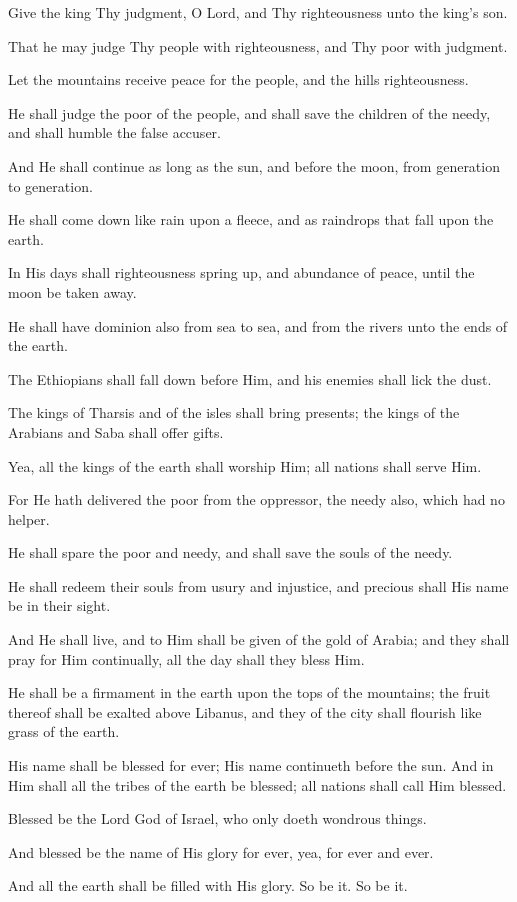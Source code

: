 Give the king Thy judgment, O Lord, and Thy righteousness unto the king's son.

That he may judge Thy people with righteousness, and Thy poor with judgment.

Let the mountains receive peace for the people, and the hills righteousness.

He shall judge the poor of the people, and shall save the children of the needy, and shall humble the false accuser.

And He shall continue as long as the sun, and before the moon, from generation to generation.

He shall come down like rain upon a fleece, and as raindrops that fall upon the earth.

In His days shall righteousness spring up, and abundance of peace, until the moon be taken away.

He shall have dominion also from sea to sea, and from the rivers unto the ends of the earth.

The Ethiopians shall fall down before Him, and his enemies shall lick the dust.

The kings of Tharsis and of the isles shall bring presents; the kings of the Arabians and Saba shall offer gifts.

Yea, all the kings of the earth shall worship Him; all nations shall serve Him.

For He hath delivered the poor from the oppressor, the needy also, which had no helper.

He shall spare the poor and needy, and shall save the souls of the needy.

He shall redeem their souls from usury and injustice, and precious shall His name be in their sight.

And He shall live, and to Him shall be given of the gold of Arabia; and they shall pray for Him continually, all the day shall they bless Him.

He shall be a firmament in the earth upon the tops of the mountains; the fruit thereof shall be exalted above Libanus, and they of the city shall flourish like grass of the earth.

His name shall be blessed for ever; His name continueth before the sun. And in Him shall all the tribes of the earth be blessed; all nations shall call Him blessed.

Blessed be the Lord God of Israel, who only doeth wondrous things.

And blessed be the name of His glory for ever, yea, for ever and ever.

And all the earth shall be filled with His glory. So be it. So be it.
